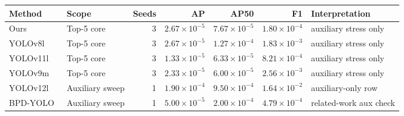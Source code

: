 \begin{tabular}{llrrrrl}
\toprule
Method & Scope & Seeds & AP & AP50 & F1 & Interpretation \\
\midrule
Ours & Top-5 core & 3 & $2.67{\times}10^{-5}$ & $7.67{\times}10^{-5}$ & $1.80{\times}10^{-4}$ & auxiliary stress only \\
YOLOv8l & Top-5 core & 3 & $2.67{\times}10^{-5}$ & $1.27{\times}10^{-4}$ & $1.83{\times}10^{-3}$ & auxiliary stress only \\
YOLOv11l & Top-5 core & 3 & $1.33{\times}10^{-5}$ & $6.33{\times}10^{-5}$ & $8.21{\times}10^{-4}$ & auxiliary stress only \\
YOLOv9m & Top-5 core & 3 & $2.33{\times}10^{-5}$ & $6.00{\times}10^{-5}$ & $2.56{\times}10^{-3}$ & auxiliary stress only \\
YOLOv12l & Auxiliary sweep & 1 & $1.90{\times}10^{-4}$ & $9.50{\times}10^{-4}$ & $1.64{\times}10^{-2}$ & auxiliary-only row \\
BPD-YOLO~\cite{chao2025bpdyolo} & Auxiliary sweep & 1 & $5.00{\times}10^{-5}$ & $2.00{\times}10^{-4}$ & $4.79{\times}10^{-4}$ & related-work aux check \\
\bottomrule
\end{tabular}
